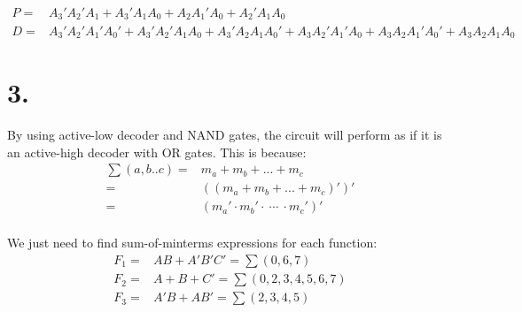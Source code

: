 \documentclass[a4paper,12pt]{article}
\begin{document}
\begin{align*}
	P =& A_3'A_2'A_1 + A_3'A_1A_0 + A_2A_1'A_0 + A_2'A_1A_0\\
	D =& A_3'A_2'A_1'A_0' + A_3'A_2'A_1A_0 + A_3'A_2A_1A_0' + A_3A_2'A_1'A_0 + A_3A_2A_1'A_0' + A_3A_2A_1A_0
\end{align*}

\section*{3.}

By using active-low decoder and NAND gates, the circuit will perform as if it is an active-high decoder with OR gates.
This is because:
\begin{align*}
	\sum(a,b..c) =& m_a + m_b + ... + m_c\\
	=& ((m_a + m_b + ... + m_c)')'\\
	=& (m_a' \cdot m_b' \cdot\ \cdots\ \cdot m_c')'\\
\end{align*}

We just need to find sum-of-minterms expressions for each function: 
\begin{align*}
	F_1 =& AB + A'B'C' = \sum(0,6,7)\\
	F_2 =& A+B+C' = \sum(0,2,3,4,5,6,7)\\
	F_3 =& A'B + AB' = \sum(2,3,4,5)
\end{align*}
\end{document}
